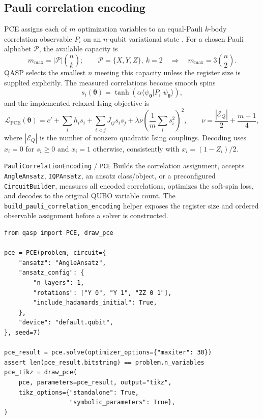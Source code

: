 \documentclass[10pt]{article}
\newcommand{\code}[1]{\texttt{#1}}
\begin{document}
\subsection{Pauli correlation encoding}
\label{sec:pce}

PCE assigns each of $m$ optimization variables to an equal-Pauli
$k$-body correlation observable $P_i$ on an $n$-qubit variational state
\cite{sciorilli2025pce}.  For a chosen Pauli alphabet $\mathcal P$, the
available capacity is
\begin{equation}
  m_{\max}=|\mathcal P|\binom{n}{k};
  \qquad \mathcal P=\{X,Y,Z\},\ k=2
  \quad\Longrightarrow\quad
  m_{\max}=3\binom{n}{2}.
  \label{eq:pce-capacity}
\end{equation}
QASP selects the smallest $n$ meeting this capacity unless the register size
is supplied explicitly.  The measured correlations become smooth spins
\begin{equation}
  s_i(\bm\theta)=\tanh\!\left(
    \alpha\langle\psi_{\bm\theta}\rvert P_i
    \lvert\psi_{\bm\theta}\rangle\right),
  \label{eq:pce-soft-spin}
\end{equation}
and the implemented relaxed Ising objective is
\begin{equation}
  \mathcal L_{\mathrm{PCE}}(\bm\theta)
  =c'+\sum_i h_i s_i+\sum_{i<j}J_{ij}s_is_j
   +\lambda\nu\left(\frac1m\sum_i s_i^2\right)^2,
  \qquad
  \nu=\frac{|\mathcal E_Q|}{2}+\frac{m-1}{4},
  \label{eq:pce-loss}
\end{equation}
where $|\mathcal E_Q|$ is the number of nonzero quadratic Ising couplings.
Decoding uses $x_i=0$ for $s_i\ge0$ and $x_i=1$ otherwise, consistently with
$x_i=(1-Z_i)/2$.

\begin{qaspfeature}{\code{PauliCorrelationEncoding} / \code{PCE}}
Builds the correlation assignment, accepts \code{AngleAnsatz},
\code{IQPAnsatz}, an ansatz class/object, or a preconfigured
\code{CircuitBuilder}, measures all encoded correlations, optimizes the
soft-spin loss, and decodes to the original QUBO variable count.  The
\code{build\_pauli\_correlation\_encoding} helper exposes the register size and
ordered observable assignment before a solver is constructed.
\end{qaspfeature}

\begin{lstlisting}[caption={Qubit-compressed PCE with a dictionary-defined QASP ansatz.},label={lst:optimization-pce}]
from qasp import PCE, draw_pce

pce = PCE(problem, circuit={
    "ansatz": "AngleAnsatz",
    "ansatz_config": {
        "n_layers": 1,
        "rotations": ["Y 0", "Y 1", "ZZ 0 1"],
        "include_hadamards_initial": True,
    },
    "device": "default.qubit",
}, seed=7)

pce_result = pce.solve(optimizer_options={"maxiter": 30})
assert len(pce_result.bitstring) == problem.n_variables
pce_tikz = draw_pce(
    pce, parameters=pce_result, output="tikz",
    tikz_options={"standalone": True,
                  "symbolic_parameters": True},
)
\end{lstlisting}
\end{document}
